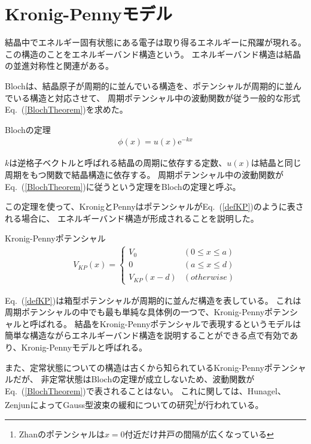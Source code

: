 \documentclass[autodetect-engine,dvipdfmx-if-dvi,ja=standard,a4paper,layout=v2]{bxjsreport}
\newcommand{\eref}[1]{Eq.~(\ref{#1})}
\begin{document}
    \section{Kronig-Pennyモデル}
    結晶中でエネルギー固有状態にある電子は取り得るエネルギーに飛躍が現れる。
    この構造のことをエネルギーバンド構造という。
    エネルギーバンド構造は結晶の並進対称性と関連がある。\par
    Blochは、結晶原子が周期的に並んでいる構造を、ポテンシャルが周期的に並んでいる構造と対応させて、
    周期ポテンシャル中の波動関数が従う一般的な形式\eref{BlochTheorem}を求めた。
    \begin{itembox}[l]{Blochの定理}
      \begin{align}
        \phi(x) = u(x) \mathrm{e}^{-k x} \label{BlochTheorem}
      \end{align}
    \end{itembox}
    $k$は逆格子ベクトルと呼ばれる結晶の周期に依存する定数、$u(x)$は結晶と同じ周期をもつ関数で結晶構造に依存する。
    周期ポテンシャル中の波動関数が\eref{BlochTheorem}に従うという定理をBlochの定理と呼ぶ。\par
    この定理を使って、KronigとPennyはポテンシャルが\eref{defKP}のように表される場合に、
    エネルギーバンド構造が形成されることを説明した。
    \begin{itembox}[l]{Kronig-Pennyポテンシャル}
    \begin{align}
        V_{KP}(x) =
        \begin{cases}
          V_0  & (0 \leq x \leq a)\\
          0    & (a \leq x \leq d)\\
          V_{KP}(x - d) & (otherwise)
        \end{cases}\label{defKP}
      \end{align}
    \end{itembox}
    \eref{defKP}は箱型ポテンシャルが周期的に並んだ構造を表している。
    これは周期ポテンシャルの中でも最も単純な具体例の一つで、Kronig-Pennyポテンシャルと呼ばれる。
    結晶をKronig-Pennyポテンシャルで表現するというモデルは
    簡単な構造ながらエネルギーバンド構造を説明することができる点で有効であり、Kronig-Pennyモデルと呼ばれる。\par
    また、定常状態についての構造は古くから知られているKronig-Pennyポテンシャルだが、
    非定常状態はBlochの定理が成立しないため、波動関数が\eref{BlochTheorem}で表されることはない。
    これに関しては、Hunagel、ZenjunによってGauss型波束の緩和についての研究\footnote{
      Zhanのポテンシャルは$x=0$付近だけ井戸の間隔が広くなっている
    }が行われている。
\end{document}
